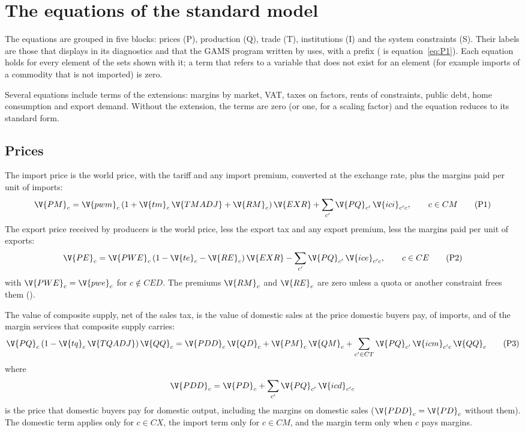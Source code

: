 \chapter{The equations of the standard model}\label{chap:equations}

The equations are grouped in five blocks: prices (P), production (Q), trade
(T), institutions (I) and the system constraints (S). Their labels are those
that  displays in its diagnostics and that the GAMS program
written by  uses, with a prefix  ( is
equation~\eqref{eq:P1}). Each equation holds for every element of the sets
shown with it; a term that refers to a variable that does not exist for an
element (for example imports of a commodity that is not imported) is zero.

Several equations include terms of the extensions: margins by market, VAT,
taxes on factors, rents of constraints, public debt, home consumption and
export demand. Without the extension, the terms are zero (or one, for a
scaling factor) and the equation reduces to its standard form.

\section{Prices}\label{sec:prices}

The import price is the world price, with the tariff and any import premium,
converted at the exchange rate, plus the margins paid per unit of imports:
\begin{equation}
\V{PM}_c = \V{pwm}_c\,(1 + \V{tm}_c\,\V{TMADJ} + \V{RM}_c)\,\V{EXR}
  + \sum_{c'} \V{PQ}_{c'}\,\V{ici}_{c'c}, \qquad c \in CM
\tag{P1}\label{eq:P1}
\end{equation}
The export price received by producers is the world price, less the export
tax and any export premium, less the margins paid per unit of exports:
\begin{equation}
\V{PE}_c = \V{PWE}_c\,(1 - \V{te}_c - \V{RE}_c)\,\V{EXR}
  - \sum_{c'} \V{PQ}_{c'}\,\V{ice}_{c'c}, \qquad c \in CE
\tag{P2}\label{eq:P2}
\end{equation}
with $\V{PWE}_c = \V{pwe}_c$ for $c \notin CED$. The premiums $\V{RM}_c$ and
$\V{RE}_c$ are zero unless a quota or another constraint frees them
().

The value of composite supply, net of the sales tax, is the value of domestic
sales at the price domestic buyers pay, of imports, and of the margin
services that composite supply carries:
\begin{equation}
\V{PQ}_c\,(1 - \V{tq}_c\,\V{TQADJ})\,\V{QQ}_c = \V{PDD}_c\,\V{QD}_c
  + \V{PM}_c\,\V{QM}_c + \sum_{c' \in CT} \V{PQ}_{c'}\,\V{icm}_{c'c}\,\V{QQ}_c
\tag{P3}\label{eq:P3}
\end{equation}
where
\begin{equation*}
\V{PDD}_c = \V{PD}_c + \sum_{c'} \V{PQ}_{c'}\,\V{icd}_{c'c}
\end{equation*}
is the price that domestic buyers pay for domestic output, including the
margins on domestic sales ($\V{PDD}_c = \V{PD}_c$ without them). The domestic
term applies only for $c \in CX$, the import term only for $c \in CM$, and the
margin term only when $c$ pays margins.

